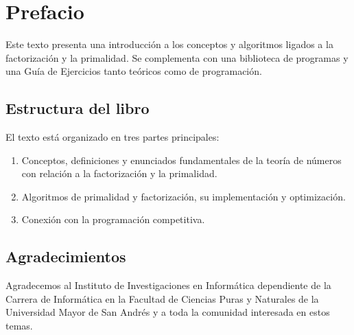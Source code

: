 \chapter*{Prefacio}
Este texto presenta una introducción a los conceptos y algoritmos ligados a la factorización y la primalidad. Se complementa con una biblioteca de programas y una Guía de Ejercicios tanto teóricos como de programación.

\section*{Estructura del libro}
El texto está organizado en tres partes principales:
\begin{enumerate}
    \item Conceptos, definiciones y enunciados fundamentales de la teoría de números con relación a la factorización y la primalidad.
    \item Algoritmos de primalidad y factorización, su implementación y optimización.
    \item Conexión con la programación competitiva.
\end{enumerate}

\section*{Agradecimientos}
Agradecemos al Instituto de Investigaciones en Informática dependiente de la Carrera de Informática en la Facultad de Ciencias Puras y Naturales de la Universidad Mayor de San Andrés y a toda la comunidad interesada en estos temas.

